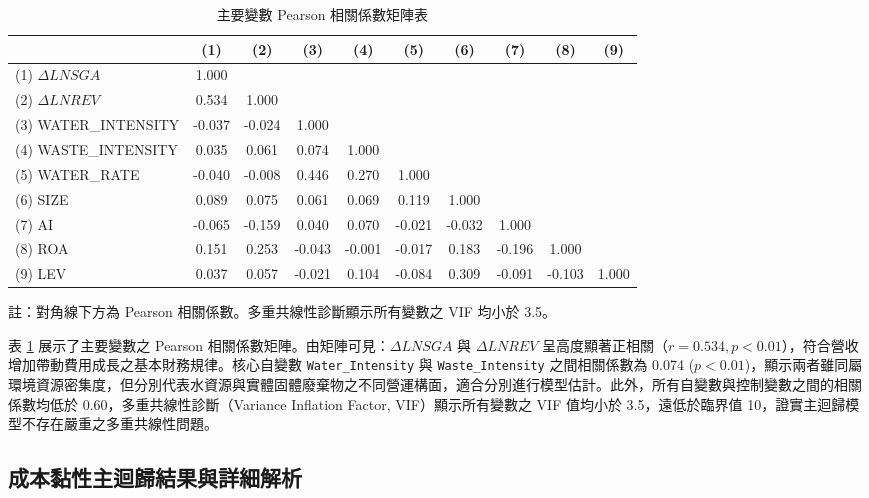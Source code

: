 \documentclass[12pt,a4paper]{article}
\begin{document}
\begin{table}[H]
\centering
\caption{主要變數 Pearson 相關係數矩陣表}
\label{tab:corr_matrix}
\begin{threeparttable}
\scriptsize
\begin{tabular}{lccccccccc}
\toprule
 & (1) & (2) & (3) & (4) & (5) & (6) & (7) & (8) & (9) \\
\midrule
(1) $\Delta LNSGA$ & 1.000 &  &  &  &  &  &  &  &  \\
(2) $\Delta LNREV$ & 0.534 & 1.000 &  &  &  &  &  &  &  \\
(3) WATER\_INTENSITY & -0.037 & -0.024 & 1.000 &  &  &  &  &  &  \\
(4) WASTE\_INTENSITY & 0.035 & 0.061 & 0.074 & 1.000 &  &  &  &  &  \\
(5) WATER\_RATE & -0.040 & -0.008 & 0.446 & 0.270 & 1.000 &  &  &  &  \\
(6) SIZE & 0.089 & 0.075 & 0.061 & 0.069 & 0.119 & 1.000 &  &  &  \\
(7) AI & -0.065 & -0.159 & 0.040 & 0.070 & -0.021 & -0.032 & 1.000 &  &  \\
(8) ROA & 0.151 & 0.253 & -0.043 & -0.001 & -0.017 & 0.183 & -0.196 & 1.000 &  \\
(9) LEV & 0.037 & 0.057 & -0.021 & 0.104 & -0.084 & 0.309 & -0.091 & -0.103 & 1.000 \\
\bottomrule
\end{tabular}
\begin{tablenotes}
\small
\item 註：對角線下方為 Pearson 相關係數。多重共線性診斷顯示所有變數之 VIF 均小於 3.5。
\end{tablenotes}
\end{threeparttable}
\end{table}

表 \ref{tab:corr_matrix} 展示了主要變數之 Pearson 相關係數矩陣。由矩陣可見：$\Delta LNSGA$ 與 $\Delta LNREV$ 呈高度顯著正相關（$r = 0.534, p < 0.01$），符合營收增加帶動費用成長之基本財務規律。核心自變數 \texttt{Water\_Intensity} 與 \texttt{Waste\_Intensity} 之間相關係數為 0.074 ($p < 0.01$)，顯示兩者雖同屬環境資源密集度，但分別代表水資源與實體固體廢棄物之不同營運構面，適合分別進行模型估計。此外，所有自變數與控制變數之間的相關係數均低於 0.60，多重共線性診斷（Variance Inflation Factor, VIF）顯示所有變數之 VIF 值均小於 3.5，遠低於臨界值 10，證實主迴歸模型不存在嚴重之多重共線性問題。

\subsection{成本黏性主迴歸結果與詳細解析}
\end{document}
